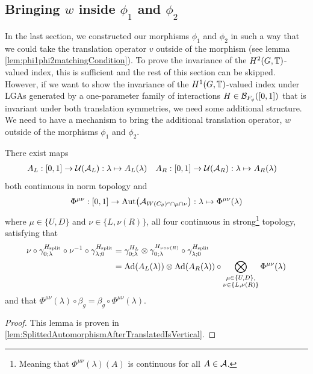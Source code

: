 \documentclass[11pt,a4paper,twoside]{article}
\numberwithin{equation}{section}
\begin{document}
	\subsection{Bringing $w$ inside $\phi_1$ and $\phi_2$}
	In the last section, we constructed our morphisms $\phi_1$ and $\phi_2$ in such a way that we could take the translation operator $v$ outside of the morphism (see lemma \ref{lem:phi1phi2matchingCondition}). To prove the invariance of the $H^2(G,\TT)$-valued index, this is sufficient and the rest of this section can be skipped. However, if we want to show the invariance of the $H^1(G,\TT)$-valued index under LGAs generated by a one-parameter family of interactions $H\in\BB_{F_\phi}([0,1])$ that is invariant under both translation symmetries, we need some additional structure. We need to have a mechanism to bring the additional translation operator, $w$ outside of the morphisms $\phi_1$ and $\phi_2$.
	\begin{lemma}\label{lem:TranslatingSplittedTimeEvolution}
		There exist maps
		\begin{align}
			A_L&:[0,1]\rightarrow \UU(\AA_L):\lambda\mapsto A_{L}(\lambda)&A_R&:[0,1]\rightarrow \UU(\AA_R):\lambda\mapsto A_{R}(\lambda)
		\end{align}
		both continuous in norm topology and
		\begin{align}
			\Phi^{\mu\nu}:[0,1]\rightarrow\Aut{\AA_{W(C_\theta)^c\cap\mu\cap\nu}}:\lambda\mapsto \Phi^{\mu\nu}(\lambda)
		\end{align}
		where $\mu\in\{U,D\}$ and $\nu\in\{L,\nu(R)\}$, all four continuous in strong\footnote{Meaning that $\Phi^{\mu\nu}(\lambda)(A)$ is continuous for all $A\in\AA$.} topology, satisfying that
		\begin{align}
			\nu\circ\gamma^{\Hsplit}_{0;\lambda}\circ\nu^{-1}\circ\gamma^{\Hsplit}_{\lambda;0}&=\gamma^{H_L}_{0;\lambda}\otimes\gamma^{H_{\nu\circ\nu(R)}}_{0;\lambda}\circ\gamma^{\Hsplit}_{\lambda;0}\\
			\label{eq:TranslatingSplittedTimeEvolution}
			&=\Ad{A_L(\lambda)}\otimes\Ad{A_R(\lambda)}\circ\bigotimes_{\substack{\mu\in\{U,D\},\\\nu\in\{L,\nu(R)\}}}\Phi^{\mu\nu}(\lambda)
		\end{align}
		and that $\Phi^{\mu\nu}(\lambda)\circ\beta_g=\beta_g\circ\Phi^{\mu\nu}(\lambda)$.
	\end{lemma}
	\begin{proof}
		This lemma is proven in \ref{lem:SplittedAutomorphismAfterTranslatedIsVertical}.
	\end{proof}
\end{document}
